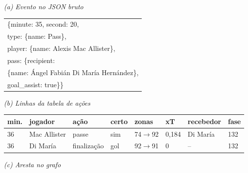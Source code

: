 \providecommand{\jq}{\char34{}}
\providecommand{\ji}{\hspace*{1.2em}}
\vspace{2mm}
\noindent\begin{minipage}{\columnwidth}
\scriptsize
\textit{(a) Evento no JSON bruto}\par\smallskip
{\ttfamily\frenchspacing
\renewcommand{\arraystretch}{1.0}%
\begin{tabular}{@{}l@{}}
\{\jq minute\jq: 35, \jq second\jq: 20, \\
\ji\jq type\jq: \{\jq name\jq: \jq Pass\jq\}, \\
\ji\jq player\jq: \{\jq name\jq: \jq Alexis Mac Allister\jq\}, \\
\ji\jq pass\jq: \{\jq recipient\jq: \\
\ji\{\jq name\jq: \jq Ángel Fabián Di María Hernández\jq\}, \\
\ji\ji\jq goal\_assist\jq: true\}\}
\end{tabular}}\par\medskip
\textit{(b) Linhas da tabela de ações}\par\smallskip
\setlength{\tabcolsep}{2pt}%
\begin{tabular}{@{}llllllll@{}}
\toprule
min. & jogador & ação & certo & zonas & xT & recebedor & fase \\
\midrule
36 & Mac Allister & passe & sim & 74$\to$92 & 0,184 & Di María & 132 \\
36 & Di María & finalização & gol & 92$\to$91 & 0 & -- & 132 \\
\bottomrule
\end{tabular}\par\medskip
\textit{(c) Aresta no grafo}\par\smallskip
\centering
{}
\label{fig:lance}
\end{minipage}\par\smallskip
